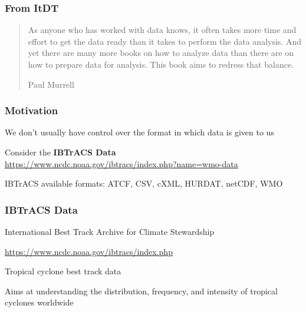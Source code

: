 \documentclass[12pt]{beamer}\usepackage[]{graphicx}\usepackage[]{color}
\begin{document}

\begin{frame}[fragile]
\frametitle{From ItDT}

\begin{quotation}
As anyone who has worked with data knows, it often takes more time and effort to get the data ready than it takes to perform the data analysis. And yet there are many more books on how to analyze data than there are on how to prepare data for analysis. This book aims to redress that balance.

\bigskip
{\footnotesize Paul Murrell}
\end{quotation}

\end{frame}


\begin{frame}
\frametitle{Motivation}

\bbi
  \item We don't usually have control over the format in which data is given to us
  \item Consider the \textbf{IBTrACS Data} \\
  {\scriptsize \url{https://www.ncdc.noaa.gov/ibtracs/index.php?name=wmo-data}}
  \item IBTrACS available formats: ATCF, CSV, cXML, HURDAT, netCDF, WMO
\ei
\eb

\end{frame}


\begin{frame}
\begin{center}
\Huge{}
\end{center}
\end{frame}


\begin{frame}
\frametitle{IBTrACS Data}

\bbi
  \item International Best Track Archive for Climate Stewardship
  \item \url{https://www.ncdc.noaa.gov/ibtracs/index.php}
  \item Tropical cyclone best track data 
  \item Aims at understanding the distribution, frequency, and intensity of tropical cyclones worldwide
\ei
\eb

\end{frame}
\end{document}
